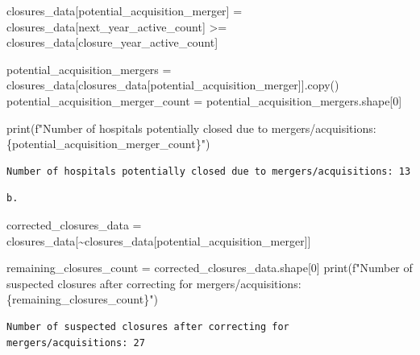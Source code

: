 \documentclass[
  letterpaper,
  DIV=11,
  numbers=noendperiod]{scrartcl}
\newenvironment{Shaded}{\begin{snugshade}}{\end{snugshade}}
\newcommand{\BuiltInTok}[1]{\textcolor[rgb]{0.00,0.23,0.31}{#1}}
\newcommand{\DecValTok}[1]{\textcolor[rgb]{0.68,0.00,0.00}{#1}}
\newcommand{\NormalTok}[1]{\textcolor[rgb]{0.00,0.23,0.31}{#1}}
\newcommand{\OperatorTok}[1]{\textcolor[rgb]{0.37,0.37,0.37}{#1}}
\newcommand{\SpecialCharTok}[1]{\textcolor[rgb]{0.37,0.37,0.37}{#1}}
\newcommand{\SpecialStringTok}[1]{\textcolor[rgb]{0.13,0.47,0.30}{#1}}
\newcommand{\StringTok}[1]{\textcolor[rgb]{0.13,0.47,0.30}{#1}}
\begin{document}
\begin{Shaded}
\begin{Highlighting}[]
\NormalTok{closures\_data[}\StringTok{\textquotesingle{}potential\_acquisition\_merger\textquotesingle{}}\NormalTok{] }\OperatorTok{=}\NormalTok{ closures\_data[}\StringTok{\textquotesingle{}next\_year\_active\_count\textquotesingle{}}\NormalTok{] }\OperatorTok{\textgreater{}=}\NormalTok{ closures\_data[}\StringTok{\textquotesingle{}closure\_year\_active\_count\textquotesingle{}}\NormalTok{]}

\NormalTok{potential\_acquisition\_mergers }\OperatorTok{=}\NormalTok{ closures\_data[closures\_data[}\StringTok{\textquotesingle{}potential\_acquisition\_merger\textquotesingle{}}\NormalTok{]].copy()}
\NormalTok{potential\_acquisition\_merger\_count }\OperatorTok{=}\NormalTok{ potential\_acquisition\_mergers.shape[}\DecValTok{0}\NormalTok{]}

\BuiltInTok{print}\NormalTok{(}\SpecialStringTok{f"Number of hospitals potentially closed due to mergers/acquisitions: }\SpecialCharTok{\{}\NormalTok{potential\_acquisition\_merger\_count}\SpecialCharTok{\}}\SpecialStringTok{"}\NormalTok{)}
\end{Highlighting}
\end{Shaded}

\begin{verbatim}
Number of hospitals potentially closed due to mergers/acquisitions: 13
\end{verbatim}

\begin{verbatim}
b.
\end{verbatim}

\begin{Shaded}
\begin{Highlighting}[]
\NormalTok{corrected\_closures\_data }\OperatorTok{=}\NormalTok{ closures\_data[}\OperatorTok{\textasciitilde{}}\NormalTok{closures\_data[}\StringTok{\textquotesingle{}potential\_acquisition\_merger\textquotesingle{}}\NormalTok{]]}

\NormalTok{remaining\_closures\_count }\OperatorTok{=}\NormalTok{ corrected\_closures\_data.shape[}\DecValTok{0}\NormalTok{]}
\BuiltInTok{print}\NormalTok{(}\SpecialStringTok{f"Number of suspected closures after correcting for mergers/acquisitions: }\SpecialCharTok{\{}\NormalTok{remaining\_closures\_count}\SpecialCharTok{\}}\SpecialStringTok{"}\NormalTok{)}
\end{Highlighting}
\end{Shaded}

\begin{verbatim}
Number of suspected closures after correcting for mergers/acquisitions: 27
\end{verbatim}
\end{document}
